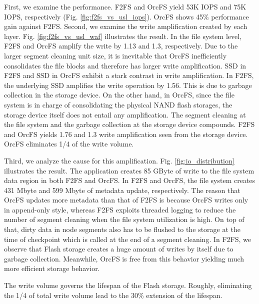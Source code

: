 \documentclass[pageno]{jpaper}
\begin{document}
First, we examine the performance. F2FS and OrcFS yield 53K IOPS and
75K IOPS, respectively (Fig. \ref{fig:f2fs_vs_usl_iops}). OrcFS shows
45\% performance gain against F2FS. Second, we examine the write
amplification created by each layer. Fig. \ref{fig:f2fs_vs_usl_waf}
illustrates the result. In the file system level, F2FS and OrcFS
amplify the write by 1.13 and 1.3, respectively. Due to the larger
segment cleaning unit size, it is inevitable that OrcFS inefficiently
consolidates the file blocks and therefore has larger write
amplification. SSD in F2FS and SSD in OrcFS exhibit a stark contrast in
write amplification. In F2FS, the underlying SSD amplifies the write
operation by 1.56. This is due to garbage collection in the storage
device. On the other hand, in OrcFS, since the file system is in charge
of consolidating the physical NAND flash storages, the storage device
itself does not entail any amplification.  The segment cleaning at the
file system and the garbage collection at the storage device
compounds. F2FS and OrcFS yields 1.76 and 1.3 write amplification seen
from the storage device. OrcFS eliminates 1/4 of the write volume.

Third, we analyze the cause for this
amplification. Fig. \ref{fig:io_distribution} illustrates the
result. The application creates 85 GByte of write to the file system
data region in both F2FS and OrcFS. In F2FS and OrcFS, the file system
creates 431 Mbyte and 599 Mbyte of metadata update, respectively.  The
reason that OrcFS updates more metadata than that of F2FS is because
OrcFS writes only in append-only style, whereas F2FS exploits threaded
logging \cite{lee2015f2fs} to reduce the number of segment cleaning
when the file system utilization is high. On top of that, dirty data
in node segments also has to be flushed to the storage at the time of
checkpoint which is called at the end of a segment cleaning.  In F2FS,
we observe that Flash storage creates a huge amount of writes by itself
due to garbage collection. Meanwhile, OrcFS is free from this behavior
yielding much more efficient storage behavior.

The write volume governs the lifespan of the Flash storage. Roughly,
eliminating the 1/4 of total write volume lead to the 30\% extension
of the lifespan.
\end{document}
